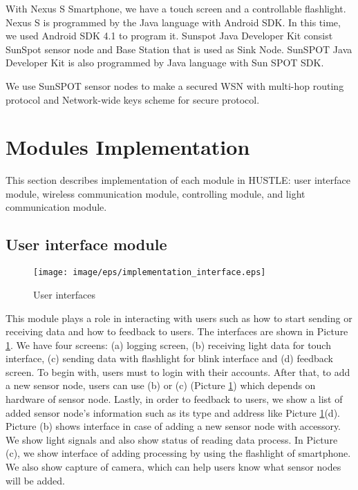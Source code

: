 With Nexus S Smartphone, we have a touch screen and a controllable flashlight. Nexus S is programmed by the Java language with Android SDK. In this time, we used Android SDK 4.1 to program it. Sunspot Java Developer Kit consist SunSpot sensor node and Base Station that is used as Sink Node. SunSPOT Java Developer Kit is also programmed by Java language with Sun SPOT SDK.

We use SunSPOT sensor nodes to make a secured WSN with multi-hop routing protocol and Network-wide keys scheme\cite{Simplicio:2010:SKM:1862461.1862545} for secure protocol.

\section{Modules Implementation}

This section describes implementation of each module in HUSTLE: user interface module, wireless communication module, controlling module, and light communication module.

\subsection{User interface module}

\begin{figure}[tb]
\centering
\texttt{[image: image/eps/implementation\_interface.eps]}
\caption{User interfaces}
\label{fig:implementation_interface}
\end{figure}

This module plays a role in interacting with users such as how to start sending or receiving data and how to feedback to users. The interfaces are shown in Picture \ref{fig:implementation_interface}. We have four screens: (a) logging screen, (b) receiving light data for touch interface, (c) sending data with flashlight for blink interface and (d) feedback screen. To begin with, users must to login with their accounts. After that, to add a new sensor node, users can use (b) or (c) (Picture \ref{fig:implementation_interface}) which depends on hardware of sensor node. Lastly, in order to feedback to users, we show a list of added sensor node's information such as its type and address like Picture \ref{fig:implementation_interface}(d). Picture (b) shows interface in case of adding a new sensor node with accessory. We show light signals and also show status of reading data process. In Picture (c), we show interface of adding processing by using the flashlight of smartphone. We also show capture of camera, which can help users know what sensor nodes will be added.

